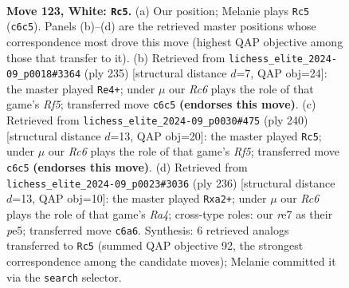 \documentclass[11pt]{article}
\begin{document}
\clearpage

\begin{figure}[p]\centering
\begin{subfigure}{0.46\textwidth}\centering
\resizebox{\linewidth}{!}{%
\newchessgame
\chessboard[
  setfen={k7/4r3/2R1p3/4P3/5P1R/8/4K3/8 w - - 31 123},
  showmover=false,
  pgfstyle=straightmove, color=movearrow, markmove={c6-c5}
]}
\caption{}
\end{subfigure}\hfill
\begin{subfigure}{0.46\textwidth}\centering
\resizebox{\linewidth}{!}{%
\newchessgame
\chessboard[
  setfen={8/7k/6p1/7p/5r1P/8/4K3/7R b - - 97 118},
  showmover=false,
  pgfstyle=straightmove, color=movearrow, markmove={f4-e4}
]}
\caption{}
\end{subfigure}
\\[4pt]
\begin{subfigure}{0.46\textwidth}\centering
\resizebox{\linewidth}{!}{%
\newchessgame
\chessboard[
  setfen={8/8/7k/5R1p/7P/6P1/6K1/r7 w - - 87 121},
  showmover=false,
  pgfstyle=straightmove, color=movearrow, markmove={f5-c5}
]}
\caption{}
\end{subfigure}\hfill
\begin{subfigure}{0.46\textwidth}\centering
\resizebox{\linewidth}{!}{%
\newchessgame
\chessboard[
  setfen={8/8/5K2/4p2P/R3P3/8/pk6/6r1 w - - 5 119},
  showmover=false,
  pgfstyle=straightmove, color=movearrow, markmove={a4-a2}
]}
\caption{}
\end{subfigure}
\caption{\textbf{Move 123, White: \texttt{Rc5}.} (a) Our position; Melanie plays \texttt{Rc5} (\texttt{c6c5}). Panels (b)--(d) are the retrieved master positions whose correspondence most drove this move (highest QAP objective among those that transfer to it). (b) Retrieved from \texttt{lichess\_elite\_2024-09\_p0018\#3364} (ply 235) [structural distance $d$=7, QAP obj=24]: the master played \texttt{Re4+}; under $\mu$ our \emph{Rc6} plays the role of that game's \emph{Rf5}; transferred move \texttt{c6c5} \textbf{(endorses this move)}. (c) Retrieved from \texttt{lichess\_elite\_2024-09\_p0030\#475} (ply 240) [structural distance $d$=13, QAP obj=20]: the master played \texttt{Rc5}; under $\mu$ our \emph{Rc6} plays the role of that game's \emph{Rf5}; transferred move \texttt{c6c5} \textbf{(endorses this move)}. (d) Retrieved from \texttt{lichess\_elite\_2024-09\_p0023\#3036} (ply 236) [structural distance $d$=13, QAP obj=10]: the master played \texttt{Rxa2+}; under $\mu$ our \emph{Rc6} plays the role of that game's \emph{Ra4}; cross-type roles: our \emph{r}e7 as their \emph{p}e5; transferred move \texttt{c6a6}. Synthesis: 6 retrieved analogs transferred to \texttt{Rc5} (summed QAP objective 92, the strongest correspondence among the candidate moves); Melanie committed it via the \texttt{search} selector.}
\label{fig:thought-m244}
\end{figure}
\end{document}
